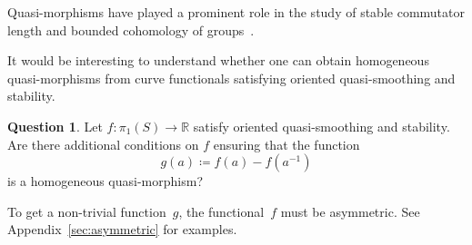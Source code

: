 \documentclass[11pt]{amsart}
\numberwithin{equation}{section}
\numberwithin{figure}{section}
\theoremstyle{definition}
\newtheorem{question}[theorem]{Question}
\theoremstyle{plain}
\begin{document}
Quasi-morphisms have played a prominent role in the study of stable commutator length and bounded cohomology of groups~\cite{Cal09:scl,Pic97:BoundedCohomology_currents}.

It would be interesting to understand whether one can obtain homogeneous quasi-morphisms from curve functionals satisfying oriented quasi-smoothing and stability.

\begin{question}
Let $f \colon \pi_1(S) \to \mathbb{R}$ satisfy oriented quasi-smoothing and stability.  
Are there additional conditions on $f$ ensuring that the function
\[
g(a) \coloneqq f(a) - f(a^{-1})
\]
is a homogeneous quasi-morphism?
\end{question} 

To get a non-trivial function~$g$, the functional~$f$ must be
asymmetric. See Appendix~\ref{sec:asymmetric} for examples.


\end{document}
